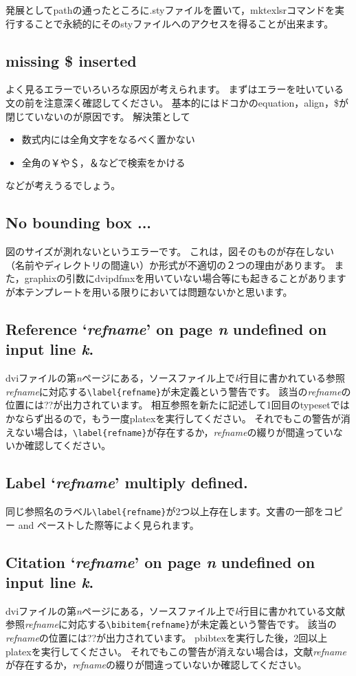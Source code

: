 \documentclass[10pt,a4paper,oneside,twocolumn,fleqn,dvipdfmx]{jsarticle}
\begin{document}
発展としてpathの通ったところに.styファイルを置いて，mktexlsrコマンドを実行することで永続的にそのstyファイルへのアクセスを得ることが出来ます。

\subsection{missing \$ inserted}
よく見るエラーでいろいろな原因が考えられます。
まずはエラーを吐いている文の前を注意深く確認してください。
基本的にはドコかのequation，align，\$が閉じていないのが原因です。
解決策として
\begin{itemize}
	\item 数式内には全角文字をなるべく置かない
	\item 全角の￥や＄，＆などで検索をかける
\end{itemize}
などが考えうるでしょう。

\subsection{No bounding box ...}
図のサイズが測れないというエラーです。
これは，図そのものが存在しない（名前やディレクトリの間違い）か形式が不適切の２つの理由があります。
また，graphixの引数にdvipdfmxを用いていない場合等にも起きることがありますが本テンプレートを用いる限りにおいては問題ないかと思います。

\subsection{Reference `\textit{refname}' on page \textit{n} undefined on input line \textit{k}.}
dviファイルの第\textit{n}ページにある，ソースファイル上で\textit{k}行目に書かれている参照\textit{refname}に対応する\verb|\label{refname}|が未定義という警告です。
該当の\textit{refname}の位置には??が出力されています。
相互参照を新たに記述して1回目のtypesetではかならず出るので，もう一度platexを実行してください。
それでもこの警告が消えない場合は，\verb|\label{refname}|が存在するか，\textit{refname}の綴りが間違っていないか確認してください。

\subsection{Label `\textit{refname}' multiply defined.}
同じ参照名のラベル\verb|\label{refname}|が2つ以上存在します。文書の一部をコピー and ペーストした際等によく見られます。

\subsection{Citation `\textit{refname}' on page \textit{n} undefined on input line \textit{k}.}
dviファイルの第\textit{n}ページにある，ソースファイル上で\textit{k}行目に書かれている文献参照\textit{refname}に対応する\verb|\bibitem{refname}|が未定義という警告です。
該当の\textit{refname}の位置には??が出力されています。
pbibtexを実行した後，2回以上platexを実行してください。
それでもこの警告が消えない場合は，文献\textit{refname}が存在するか，\textit{refname}の綴りが間違っていないか確認してください。
\end{document}
